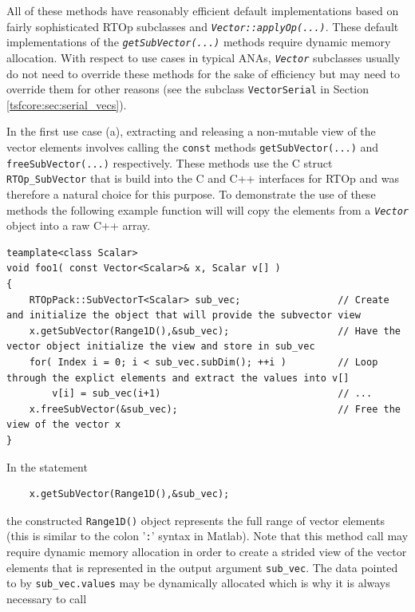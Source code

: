 \documentclass[10pt,fleqn]{article}
\begin{document}
All of these methods have reasonably efficient default implementations
based on fairly sophisticated RTOp subclasses and
\texttt{\textit{Vector::applyOp(...)}}.  These default implementations of the
\texttt{\textit{getSubVector(...)}} methods require dynamic memory allocation.
With respect to use cases in typical ANAs, \texttt{\textit{Vector}}
subclasses usually do not need to override these methods for the sake
of efficiency but may need to override them for other reasons (see the
subclass \texttt{VectorSerial} in Section \ref{tsfcore:sec:serial_vecs}).

In the first use case (a), extracting and releasing a non-mutable view of the
vector elements involves calling the \texttt{const} methods
\texttt{getSubVector(...)} and
\texttt{freeSubVector(...)} respectively.  These methods use the C struct
\texttt{RTOp\_SubVector} that is build into the C and C++ interfaces for RTOp
and was therefore a natural choice for this purpose.  To demonstrate
the use of these methods the following example function will will copy
the elements from a \texttt{\textit{Vector}} object into a raw C++
array.

{\scriptsize\begin{verbatim}
teamplate<class Scalar>
void foo1( const Vector<Scalar>& x, Scalar v[] )
{
    RTOpPack::SubVectorT<Scalar> sub_vec;                 // Create and initialize the object that will provide the subvector view
    x.getSubVector(Range1D(),&sub_vec);                   // Have the vector object initialize the view and store in sub_vec
    for( Index i = 0; i < sub_vec.subDim(); ++i )         // Loop through the explict elements and extract the values into v[]
        v[i] = sub_vec(i+1)                               // ...
    x.freeSubVector(&sub_vec);                            // Free the view of the vector x
}
\end{verbatim}}

In the statement

{\scriptsize\begin{verbatim}
    x.getSubVector(Range1D(),&sub_vec);
\end{verbatim}}

the constructed \texttt{Range1D()} object represents the full range of
vector elements (this is similar to the colon '\texttt{:}' syntax
in Matlab).  Note that this method call may require dynamic memory
allocation in order to create a strided view of the vector elements
that is represented in the output argument \texttt{sub\_vec}.  The
data pointed to by \texttt{sub\_vec.values} may be dynamically
allocated which is why it is always necessary to call
\end{document}
